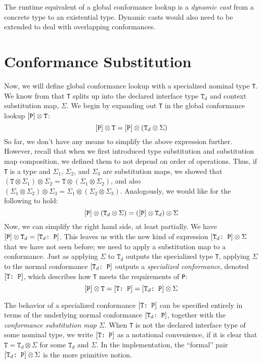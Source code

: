 \documentclass[../generics]{subfiles}
\begin{document}
The runtime equivalent of a global conformance lookup is a \emph{dynamic cast} from a concrete type to an existential type. Dynamic casts would also need to be extended to deal with overlapping conformances.

\section{Conformance Substitution}\label{conformance subst}

Now, we will define global conformance lookup with a specialized nominal type \texttt{T}. We know from  that \texttt{T} splits up into the declared interface type $\texttt{T}_d$ and context substitution map, $\Sigma$. We begin by expanding out \texttt{T} in the global conformance lookup $[\texttt{P}]\otimes\texttt{T}$:
\[
[\texttt{P}]\otimes\texttt{T} = [\texttt{P}] \otimes (\texttt{T}_d \otimes \Sigma)
\]
So far, we don't have any means to simplify the above expression further. However, recall that when we first introduced type substitution and substitution map composition, we defined them to not depend on order of operations. Thus, if \texttt{T} is a type and $\Sigma_1$, $\Sigma_2$, and $\Sigma_3$ are substitution maps, we showed that $(\texttt{T}\otimes\Sigma_1)\otimes\Sigma_2=\texttt{T}\otimes(\Sigma_1\otimes\Sigma_2)$, and also $(\Sigma_1\otimes\Sigma_2)\otimes\Sigma_3=\Sigma_1\otimes(\Sigma_2\otimes\Sigma_3)$. Analogously, we would like for the following to hold:
\[
[\texttt{P}] \otimes (\texttt{T}_d \otimes \Sigma) = ([\texttt{P}] \otimes \texttt{T}_d) \otimes \Sigma
\]
Now, we can simplify the right hand side, at least partially. We have $[\texttt{P}]\otimes\texttt{T}_d=[\texttt{$\texttt{T}_d$:~P}]$. This leaves us with the new kind of expression $[\texttt{$\texttt{T}_d$:~P}]\otimes\Sigma$ that we have not seen before; we need to apply a substitution map to a conformance. Just as applying $\Sigma$ to $\texttt{T}_d$ outputs the specialized type \texttt{T}, applying $\Sigma$ to the normal conformance $[\texttt{$\texttt{T}_d$:~P}]$ outputs a \emph{specialized conformance}, denoted $[\texttt{T:~P}]$, which describes how \texttt{T} meets the requirements of \texttt{P}:
\[[\texttt{P}]\otimes\texttt{T}=[\texttt{T:~P}]=[\texttt{$\texttt{T}_d$:~P}]\otimes\Sigma\]

The behavior of a specialized conformance $[\texttt{T:~P}]$ can be specified entirely in terms of the underlying normal conformance $[\texttt{$\texttt{T}_d$:~P}]$, together with the \emph{conformance substitution map} $\Sigma$. When \texttt{T} is not the declared interface type of some nominal type, we write $[\texttt{T:~P}]$ as a notational convenience, if it is clear that $\texttt{T}=\texttt{T}_d\otimes\Sigma$ for some $\texttt{T}_d$ and $\Sigma$. In the implementation, the ``formal'' pair $[\texttt{$\texttt{T}_d$:~P}]\otimes\Sigma$ is the more primitive notion.
\end{document}
